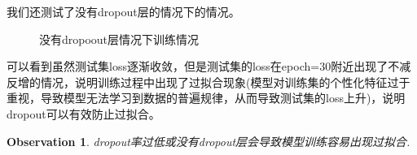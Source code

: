 \documentclass[11pt]{article}
\newtheorem{observation}[theorem]{Observation}
\begin{document}
我们还测试了没有dropout层的情况下的情况。\par
\begin{figure}[H]
  \centering
  \hspace{0.5in} %
  \caption{没有dropoout层情况下训练情况}
  \label{fig:twopicture} 
\end{figure}
可以看到虽然测试集loss逐渐收敛，但是测试集的loss在epoch=30附近出现了不减反增的情况，说明训练过程中出现了过拟合现象(模型对训练集的个性化特征过于重视，导致模型无法学习到数据的普遍规律，从而导致测试集的loss上升)，说明dropout可以有效防止过拟合。
\begin{observation}
dropout率过低或没有dropout层会导致模型训练容易出现过拟合.\par
\end{observation}
\end{document}
